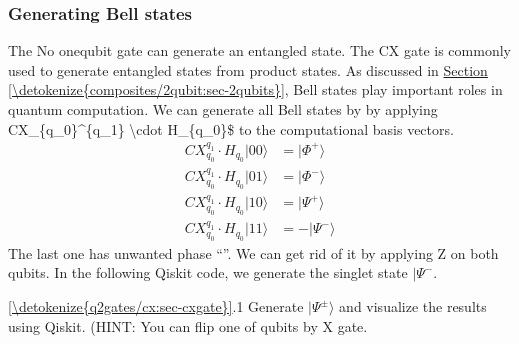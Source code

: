 \documentclass[letterpaper,10pt,english]{jupyterBook}
\begin{document}
\subsubsection{Generating Bell states}
\label{\detokenize{q2gates/cx:generating-bell-states}}
\sphinxAtStartPar
The
No one\sphinxhyphen{}qubit gate can generate an entangled state.  The CX gate is commonly used to generate entangled states from product states.  As discussed in \hyperref[\detokenize{composites/2qubit:sec-2qubits}]{Section \ref{\detokenize{composites/2qubit:sec-2qubits}}}, Bell states play important roles in quantum computation. We can generate all Bell states by by applying CX\_\{q\_0\}\textasciicircum{}\{q\_1\} \textbackslash{}cdot H\_\{q\_0\}\$ to the computational basis vectors.
\begin{align}
CX_{q_0}^{q_1} \cdot H_{q_0} |00\rangle &= |\Phi^{+}\rangle \\
CX_{q_0}^{q_1} \cdot H_{q_0} |01\rangle &= |\Phi^{-}\rangle \\
CX_{q_0}^{q_1} \cdot H_{q_0} |10\rangle &= |\Psi^{+}\rangle \\
CX_{q_0}^{q_1} \cdot H_{q_0} |11\rangle &= -|\Psi^{-}\rangle\label{equation:q2gates/cx:cbase-Bell}
\end{align}
\sphinxAtStartPar
The last one has unwanted phase “\sphinxhyphen{}”.  We can get rid of it by applying Z on both qubits.  In the following Qiskit code, we generate the singlet state \(|\Psi^{-}\).

\sphinxAtStartPar
{}  \hyperref[\detokenize{q2gates/cx:sec-cxgate}]{\ref{\detokenize{q2gates/cx:sec-cxgate}}}.1  Generate \(|\Psi^{\pm}\rangle\) and visualize the results using Qiskit. (HINT: You can flip one of qubits by X gate.
\end{document}
